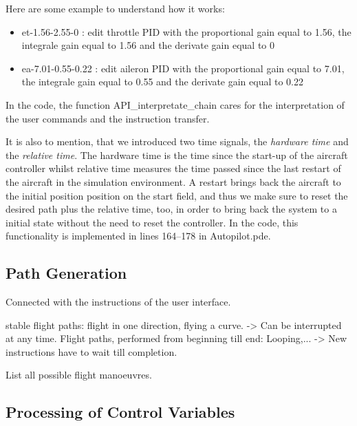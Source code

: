 \documentclass[11pt,a4paper]{scrartcl}		%
\begin{document}
Here are some example to understand how it works:

\begin{itemize}
\item 
et-1.56-2.55-0 : edit throttle PID with the proportional gain equal to 1.56, the integrale gain equal to 1.56 and the derivate gain equal to 0
\item
ea-7.01-0.55-0.22 : edit aileron PID with the proportional gain equal to 7.01, the integrale gain equal to 0.55 and the derivate gain equal to 0.22
\end{itemize}

In the code, the function \textsf{API\_interpretate\_chain} cares for the interpretation of the user commands and the instruction transfer.

\bigskip

It is also to mention, that we introduced two time signals, the \textsl{hardware time} and the \textsl{relative time}.
The hardware time is the time since the start-up of the aircraft controller whilst relative time measures the time passed since the last restart of the aircraft in the simulation environment.
A restart brings back the aircraft to the initial position position on the start field, and thus we make sure to reset the desired path plus the relative time, too, in order to bring back the system to a initial state without the need to reset the controller.
In the code, this functionality is implemented in lines 164--178 in \textsf{Autopilot.pde}.

\medskip




\subsection{Path Generation} \label{ch-Path-Generation}

Connected with the instructions of the user interface.

stable flight paths: flight in one direction, flying a curve. -> Can be interrupted at any time.
Flight paths, performed from beginning till end: Looping,... -> New instructions have to wait till completion.

List all possible flight manoeuvres.


\medskip





\subsection{Processing of Control Variables}
\end{document}
